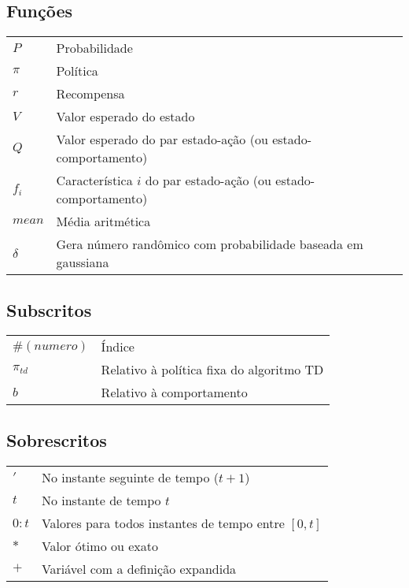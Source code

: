 \subsection*{Funções}

\begin{tabular}{p{}p{}}
$P$ & Probabilidade\tabularnewline
$\pi$ & Política\tabularnewline
$r$ & Recompensa\tabularnewline
$V$ & Valor esperado do estado\tabularnewline
$Q$ & Valor esperado do par estado-ação (ou estado-comportamento)\tabularnewline
$f_i$ & Característica $ i $ do par estado-ação (ou estado-comportamento)\tabularnewline
$mean$ & Média aritmética\tabularnewline
$\delta$  & Gera número randômico com probabilidade baseada em gaussiana \tabularnewline
\end{tabular}


\subsection*{Subscritos}

\begin{tabular}{p{}p{}}
$\#(numero)$  & Índice \tabularnewline
$\pi_{td}$  & Relativo à política fixa do algoritmo TD \tabularnewline
$b$  & Relativo à comportamento \tabularnewline
\end{tabular}


\subsection*{Sobrescritos}

\begin{tabular}{p{}p{}}
$'$  & No instante seguinte de tempo ($ t+1 $) \tabularnewline
$t$  & No instante de tempo $ t $ \tabularnewline
$0:t$  & Valores para todos instantes de tempo entre $\left[0, t\right]$ \tabularnewline
$*$  & Valor ótimo ou exato \tabularnewline
$+$  & Variável com a definição expandida \tabularnewline
\end{tabular}
